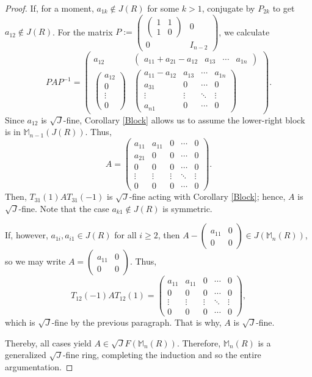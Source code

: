 \documentclass[12pt]{amsart}
\theoremstyle{definition}
\begin{document}
\begin{proof}
If, for a moment, $a_{1k}\not\in J(R)$ for some $k>1$, conjugate by $P_{2k}$ to get $a_{12}\not\in J(R)$. For the matrix $P:=\begin{pmatrix}\begin{pmatrix}1&1\\1&0\end{pmatrix}&0\\0&I_{n-2}\end{pmatrix}$, we calculate
	\[
	PAP^{-1}=
	\begin{pmatrix}
		a_{12} & \begin{pmatrix}a_{11}+a_{21}-a_{12}&a_{13}&\cdots&a_{1n}\end{pmatrix}\\
		\begin{pmatrix}a_{12}\\0\\ \vdots\\0\end{pmatrix} &
		\begin{pmatrix}
			a_{11}-a_{12}&a_{13}&\cdots&a_{1n}\\
			a_{31}&0&\cdots&0\\
			\vdots&\vdots&\ddots&\vdots\\
			a_{n1}&0&\cdots&0
		\end{pmatrix}
	\end{pmatrix}.
	\]
Since $a_{12}$ is $\sqrt{J}$-fine, Corollary \ref{Block} allows us to assume the lower-right block is in $\mathbb{M}_{n-1}(J(R))$. Thus,
	\[
	A=
	\begin{pmatrix}
		a_{11}&a_{11}&0&\cdots&0\\
		a_{21}&0&0&\cdots&0\\
		0&0&0&\cdots&0\\
		\vdots&\vdots&\vdots&\ddots&\vdots\\
		0&0&0&\cdots&0
	\end{pmatrix}.
	\]
Then, $T_{31}(1)AT_{31}(-1)$ is $\sqrt{J}$-fine acting with Corollary \ref{Block}; hence, $A$ is $\sqrt{J}$-fine. Note that the case $a_{k1}\not\in J(R)$ is symmetric.
	
If, however, $a_{1i},a_{i1}\in J(R)$ for all $i\ge 2$, then $A-\begin{pmatrix}a_{11}&0\\0&0\end{pmatrix}\in J(\mathbb{M}_n(R))$, so we may write $A=\begin{pmatrix}a_{11}&0\\0&0\end{pmatrix}$. Thus,
	\[
	T_{12}(-1)AT_{12}(1)=
	\begin{pmatrix}
		a_{11}&a_{11}&0&\cdots&0\\
		0&0&0&\cdots&0\\
		\vdots&\vdots&\vdots&\ddots&\vdots\\
		0&0&0&\cdots&0
	\end{pmatrix},
	\]
which is $\sqrt{J}$-fine by the previous paragraph. That is why, $A$ is $\sqrt{J}$-fine.
	
Thereby, all cases yield $A\in\sqrt{J}F(\mathbb{M}_n(R))$. Therefore, $\mathbb{M}_n(R)$ is a generalized $\sqrt{J}$-fine ring, completing the induction and so the entire argumentation.
\end{proof}
\end{document}
